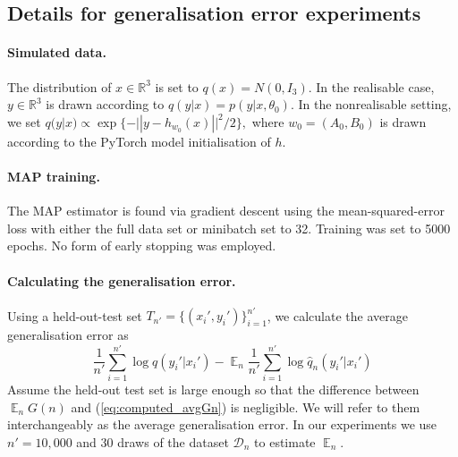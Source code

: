 \documentclass[11pt]{article}
\DeclareMathOperator*{\E}{\operatorname{\mathbb{E}}}
\numberwithin{equation}{section}
\theoremstyle{plain}
\theoremstyle{definition}
\begin{document}
\subsection{Details for generalisation error experiments}
\label{appendix:generalizaton}

\paragraph{Simulated data.}
The distribution of $x \in \mathbb R^3$ is set to $q(x)=N(0,I_3)$. 
In the realisable case, $y \in \mathbb R^3$ is drawn according to $q(y|x) = p(y|x,\theta_0)$. In the nonrealisable setting, we set $q(y|x) \propto \exp\{-|| y - h_{w_0}(x) ||^2/2\},$ where $w_0 = (A_0,B_0)$ is drawn according to the PyTorch model initialisation of $h$.


\paragraph{MAP training.}
The MAP estimator is found via gradient descent using the mean-squared-error loss with either the full data set or minibatch set to 32. Training was set to 5000 epochs. No form of early stopping was employed.

\paragraph{Calculating the generalisation error.}
Using a held-out-test set $T_{n'} = \{(x_i',y_i')\}_{i=1}^{n'}$, we calculate the average generalisation error as
\begin{equation}
	\frac{1}{n'} \sum_{i=1}^{n'} \log q(y_i'|x_i') - {\E}_n \frac{1}{n'} \sum_{i=1}^{n'} \log \hat q_n(y_i'|x_i')
	\label{eq:computed_avgGn}
\end{equation}
Assume the held-out test set is large enough so that the difference between ${\E}_n G(n)$ and (\ref{eq:computed_avgGn}) is negligible. We will refer to them interchangeably as the average generalisation error. In our experiments we use $n' = 10,000$ and $30$ draws of the dataset $\mathcal{D}_n$ to estimate ${\E}_n$.
\end{document}
